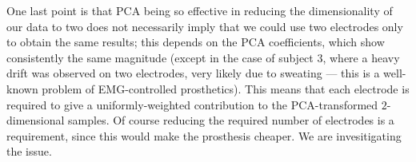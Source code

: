 One last point is that PCA being so effective in reducing the
dimensionality of our data to two does not necessarily imply that we
could use two electrodes only to obtain the same results; this depends
on the PCA coefficients, which show consistently the same magnitude
(except in the case of subject $3$, where a heavy drift was observed
on two electrodes, very likely due to sweating --- this is a well-known
problem of EMG-controlled prosthetics). This means that each electrode
is required to give a uniformly-weighted contribution to the
PCA-transformed $2$-dimensional samples. Of course reducing the
required number of electrodes is a requirement, since this would make
the prosthesis cheaper. We are invesitigating the issue.

